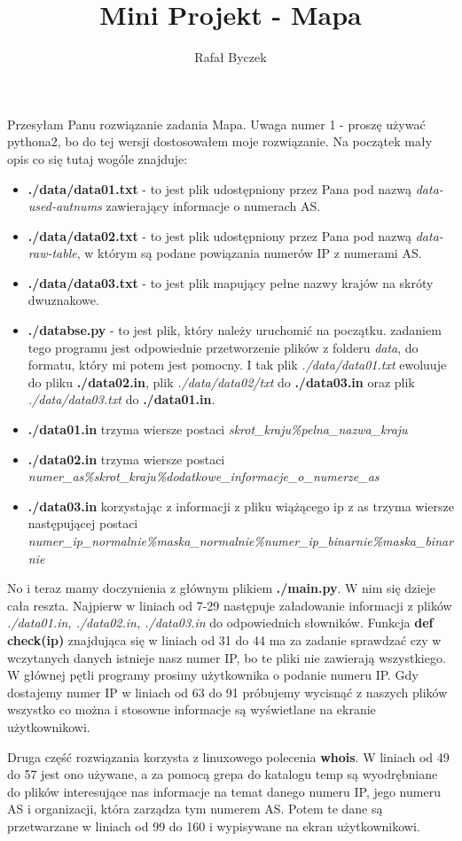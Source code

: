 \documentclass[11pt,a4paper]{article}
\author{Rafał Byczek}
\title{Mini Projekt - Mapa}
\begin{document}
\maketitle
Przesyłam Panu rozwiązanie zadania Mapa. Uwaga numer 1 - proszę używać pythona2, bo do tej wersji dostosowałem moje rozwiązanie. Na początek mały opis co się tutaj wogóle znajduje:

\begin{itemize}
\item \textbf{./data/data01.txt} - to jest plik udostępniony przez Pana pod nazwą \textit{data-used-autnums} zawierający informacje o numerach AS.
\item \textbf{./data/data02.txt} - to jest plik udostępniony przez Pana pod nazwą \textit{data-raw-table}, w którym są podane powiązania numerów IP z numerami AS.
\item \textbf{./data/data03.txt} - to jest plik mapujący pełne nazwy krajów na skróty dwuznakowe.
\item \textbf{./databse.py} - to jest plik, który należy uruchomić na początku. zadaniem tego programu jest odpowiednie przetworzenie plików z folderu \textit{data}, do formatu, który mi potem jest pomocny. I tak plik \textit{./data/data01.txt} ewoluuje do pliku \textbf{./data02.in}, plik \textit{./data/data02/txt} do \textbf{./data03.in} oraz plik \textit{./data/data03.txt} do \textbf{./data01.in}.
\item \textbf{./data01.in} trzyma wiersze postaci \textit{skrot\_kraju\%pelna\_nazwa\_kraju}
\item \textbf{./data02.in} trzyma wiersze postaci 
\textit{numer\_as\%skrot\_kraju\%dodatkowe\_informacje\_o\_numerze\_as}
\item \textbf{./data03.in} korzystając z informacji z pliku wiążącego ip z as trzyma wiersze następującej postaci
\textit{numer\_ip\_normalnie\%maska\_normalnie\%numer\_ip\_binarnie\%maska\_binarnie}
\end{itemize}

No i teraz mamy doczynienia z głównym plikiem \textbf{./main.py}. W nim się dzieje cała reszta.
Najpierw w liniach od 7-29 następuje załadowanie informacji z plików \textit{./data01.in, ./data02.in, ./data03.in} do odpowiednich słowników. Funkcja \textbf{def check(ip)} znajdująca się w liniach od 31 do 44 ma za zadanie sprawdzać czy w wczytanych danych istnieje nasz numer IP, bo te pliki nie zawierają wszystkiego. W głównej pętli programy prosimy użytkownika o podanie numeru IP. Gdy dostajemy numer IP w liniach od 63 do 91 próbujemy wycisnąć z naszych plików wszystko co można i stosowne informacje są wyświetlane na ekranie użytkownikowi. 

Druga część rozwiązania korzysta z linuxowego polecenia \textbf{whois}. W liniach od 49 do 57 jest ono używane, a za pomocą grepa do katalogu temp są wyodrębniane do plików interesujące nas informacje na temat danego numeru IP, jego numeru AS i organizacji, która zarządza tym numerem AS. Potem te dane są przetwarzane w liniach od 99 do 160 i wypisywane na ekran użytkownikowi.
\end{document}
